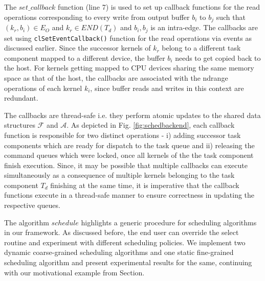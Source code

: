 	\par The $set\_callback$ function (line 7) is used to set up callback functions  for the read operations corresponding to every write from output buffer $b_i$ to $b_j$ such that $(k_r,b_i) \in E_O$ and $k_r \in END(T_d)$ and $b_i,b_j$ is an intra-edge. The callbacks are set using {\tt clSetEventCallback()} function for the read operations via events as discussed earlier. Since the successor kernels of $k_r$ belong to a different task component mapped to a different device, the buffer $b_i$ needs to get copied back to the host. For kernels getting mapped to CPU devices sharing the same memory space as that of the host, the callbacks are associated with the ndrange operations of each kernel $k_i$, since buffer reads and writes in this context are redundant.
    \par The callbacks are thread-safe i.e. they perform atomic updates to the shared data structures $\mathcal{F}$ and $\mathcal{A}$. As depicted in Fig. \ref{fig:schedbackend}, each callback function is responsible for two distinct operations - i) adding successor task components which are ready for dispatch to the task queue and ii) releasing the command queues which were locked, once all kernels of the the task component finish execution. Since, it may be possible that multiple callbacks can execute simultaneously as a consequence of multiple kernels belonging to the task component $T_d$ finishing at the same time, it is imperative that the callback functions execute in a thread-safe manner to ensure correctness in updating the respective queues. 
    
    \par The algorithm $schedule$ highlights a generic procedure for scheduling algorithms in our framework. As discussed before, the end user can override the select routine and experiment with different scheduling policies. We implement two dynamic coarse-grained scheduling algorithms and one static fine-grained scheduling algorithm and present experimental results for the same, continuing with our  motivational example from Section.





    
